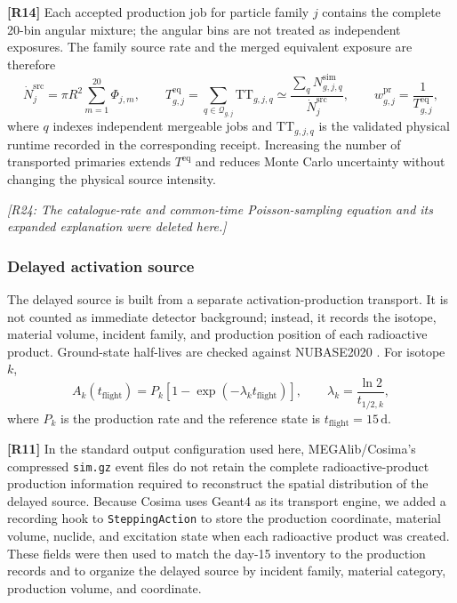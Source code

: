 \documentclass[11pt]{article}
\newcommand{\revdeleted}[1]{\par\noindent\textcolor{revisionblue}{\small\itshape [#1]}\par}
\begin{document}
\begingroup
\color{revisionblue}
\noindent\textbf{[R14]} Each accepted production job for particle family $j$
contains the complete 20-bin angular mixture; the angular bins are not treated
as independent exposures. The family source rate and the merged equivalent
exposure are therefore
\begin{equation}
 \dot N^{\mathrm{src}}_{j}=\pi R^2\sum_{m=1}^{20}\Phi_{j,m},
 \qquad
 T^{\mathrm{eq}}_{g,j}=\sum_{q\in\mathcal Q_{g,j}}\mathrm{TT}_{g,j,q}
 \simeq
 \frac{\sum_q N^{\mathrm{sim}}_{g,j,q}}{\dot N^{\mathrm{src}}_{j}},
 \qquad
 w^{\mathrm{pr}}_{g,j}=\frac{1}{T^{\mathrm{eq}}_{g,j}},
 \label{eq:prompt_equivalent_exposure}
\end{equation}
where $q$ indexes independent mergeable jobs and $\mathrm{TT}_{g,j,q}$ is the
validated physical runtime recorded in the corresponding receipt. Increasing
the number of transported primaries extends $T^{\mathrm{eq}}$ and reduces Monte
Carlo uncertainty without changing the physical source intensity.

\revdeleted{R24: The catalogue-rate and common-time Poisson-sampling equation and its expanded explanation were deleted here.}
\endgroup

\subsubsection{Delayed activation source}
\label{subsec:delayed_source}

The delayed source is built from a separate activation-production transport. It
is not counted as immediate detector background; instead, it records the isotope,
material volume, incident family, and production position of each radioactive
product. Ground-state half-lives are checked against NUBASE2020
\cite{Kondev2021NUBASE}. For isotope $k$,
\begin{equation}
  A_k(t_{\mathrm{flight}})=P_k\left[1-\exp(-\lambda_k t_{\mathrm{flight}})\right],
  \qquad \lambda_k=\frac{\ln2}{t_{1/2,k}},
\end{equation}
where $P_k$ is the production rate and the reference state is
$t_{\mathrm{flight}}=15\,\mathrm{d}$.

\begingroup
\color{revisionblue}
\noindent\textbf{[R11]} In the standard output configuration used here,
MEGAlib/Cosima's compressed \texttt{sim.gz} event files do not retain the
complete radioactive-product production information required to reconstruct
the spatial distribution of the delayed source. Because Cosima uses Geant4 as
its transport engine, we added a recording hook to \texttt{SteppingAction} to
store the production coordinate, material volume, nuclide, and excitation
state when each radioactive product was created. These fields were then used
to match the day-15 inventory to the production records and to organize the
delayed source by incident family, material category, production volume, and
coordinate.
\end{document}
